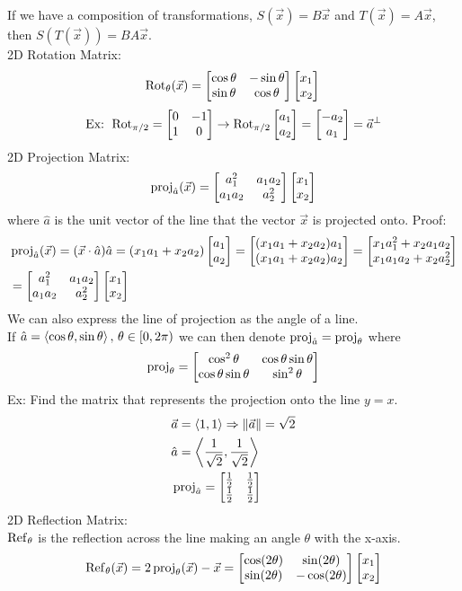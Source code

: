 \documentclass[11pt, fleqn]{article}
\begin{document}
If we have a composition of transformations, $S(\vec{x})=B\vec{x}$ and $T(\vec{x})=A\vec{x}$, then $S(T(\vec{x}))=BA\vec{x}$.\\
2D Rotation Matrix:
$$\Rot_{\theta}(\vec{x})=\matrixx{\cos\theta&-\sin\theta\\\sin\theta&\cos\theta}\matrixx{x_1\\x_2}\\$$
\begin{align*}
    \text{Ex: }\Rot_{\pi/2}=\matrixx{0&-1\\1&0}\to\Rot_{\pi/2}\matrixx{a_1\\a_2}=\matrixx{-a_2\\a_1}=\vec{a}^\perp
\end{align*}
2D Projection Matrix:
$$\proj_{\hat{a}}(\vec{x})=\matrixx{a_1^2&a_1a_2\\a_1a_2&a_2^2}\matrixx{x_1\\x_2}$$
where $\hat{a}$ is the unit vector of the line that the vector $\vec{x}$ is projected onto.
Proof:
\begin{align*}
    &\proj_{\hat{a}}(\vec{x})=(\vec{x}\cdot\hat{a})\hat{a}=(x_1a_1+x_2a_2)\matrixx{a_1\\a_2}=\matrixx{(x_1a_1+x_2a_2)a_1\\(x_1a_1+x_2a_2)a_2}=\matrixx{x_1a_1^2+x_2a_1a_2\\x_1a_1a_2+x_2a_2^2}\\
    &=\matrixx{a_1^2&a_1a_2\\a_1a_2&a_2^2}\matrixx{x_1\\x_2}
\end{align*}
We can also express the line of projection as the angle of a line.\\
If $\hat{a}=\left\langle \cos\theta,\sin\theta \right\rangle,\,\theta\in[0,2\pi)$ we can then denote $\operatorname{proj}_{\hat{a}}=\operatorname{proj}_\theta$ where
$$\proj_\theta=\matrixx{\cos^2\theta&\cos\theta\sin\theta\\\cos\theta\sin\theta&\sin^2\theta}$$
Ex: Find the matrix that represents the projection onto the line $y=x$.
\begin{align*}
    &\vec{a}=\brangle{1,1}\Ra \|\vec{a}\|=\sqrt{2}\\
    &\hat{a}=\brangle{\frac{1}{\sqrt{2}},\frac{1}{\sqrt{2}}}\\
    &\proj_{\hat{a}}=\matrixx{\frac{1}{2}&\frac{1}{2}\\\frac{1}{2}&\frac{1}{2}}
\end{align*}
2D Reflection Matrix:\\
$\operatorname{Ref}_{\theta}$ is the reflection across the line making an angle $\theta$ with the x-axis.
$$\Reflection_\theta(\vec{x})=2\proj_{\theta}(\vec{x})-\vec{x}=\matrixx{\cos(2\theta)&\sin(2\theta)\\\sin(2\theta)&-\cos(2\theta)}\matrixx{x_1\\x_2}$$
\end{document}
